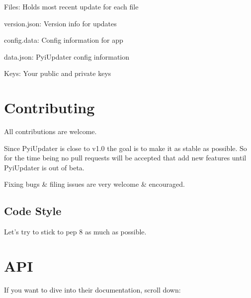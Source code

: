 \documentclass[letterpaper,10pt,english]{sphinxmanual}
\begin{document}
Files: Holds most recent update for each file

version.json: Version info for updates

config.data: Config information for app

data.json: PyiUpdater config information

Keys: Your public and private keys


\section{Contributing}
\label{contributing:contributing}\label{contributing::doc}\label{contributing:id1}
All contributions are welcome.

Since PyiUpdater is close to v1.0 the goal is to make it as stable as possible. So for the time being no pull requests will be accepted that add new features until PyiUpdater is out of beta.

Fixing bugs \& filing issues are very welcome \& encouraged.


\subsection{Code Style}
\label{contributing:code-style}
Let's try to stick to pep 8 as much as possible.


\section{API}
\label{api:api}\label{api::doc}
If you want to dive into their documentation, scroll down:
\label{api:module-pyi_updater}
\end{document}
